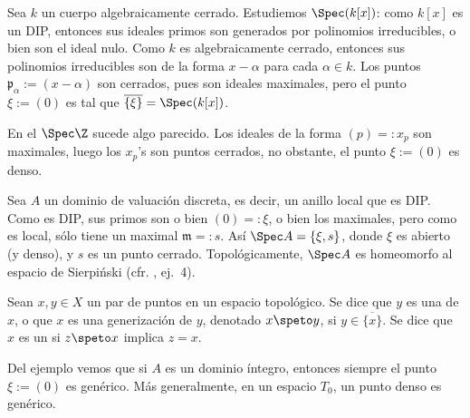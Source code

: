 \begin{ex}
	Sea $k$ un cuerpo algebraicamente cerrado.
	Estudiemos $\Spec(k[x])$: como $k[x]$ es un DIP, entonces sus ideales primos son
	generados por polinomios irreducibles, o bien son el ideal nulo.
	Como $k$ es algebraicamente cerrado, entonces sus polinomios irreducibles son de la forma $x - \alpha$ para cada $\alpha \in k$.
	Los puntos $\mathfrak{p}_\alpha := (x - \alpha)$ son cerrados, pues son
	ideales maximales, pero el punto $\xi := (0)$ es tal que $\overline{\{ \xi \}} = \Spec(k[x])$.
\end{ex}
\begin{ex}
	En el $\Spec\Z$ sucede algo parecido.
	Los ideales de la forma $(p) =: x_p$ son maximales, luego los $x_p$'s son puntos cerrados, no obstante, el
	punto $\xi := (0)$ es denso.
\end{ex}






\begin{ex}
	Sea $A$ un dominio de valuación discreta, es decir, un anillo local que es DIP.
	Como es DIP, sus primos son o bien $(0) =: \xi$, o bien los maximales, pero como es local,
	sólo tiene un maximal $\mathfrak{m} =: s$.
	Así $\Spec A = \{ \xi, s \}$, donde $\xi$ es abierto (y denso), y $s$ es un punto cerrado.
	Topológicamente, $\Spec A$ es homeomorfo al espacio de Sierpiński (cfr. \cite{Top}, ej.~4).
\end{ex}
\begin{mydef}
	Sean $x, y \in X$ un par de puntos en un espacio topológico.
	Se dice que $y$ es una  de $x$, o que $x$ es una generización de $y$,
	denotado $x \speto y$, si $y \in \overline{\{ x \}}$.
	Se dice que $x$ es un  si $z \speto x$ implica $z = x$.
\end{mydef}
Del ejemplo vemos que si $A$ es un dominio íntegro, entonces siempre el punto $\xi := (0)$ es genérico.
Más generalmente, en un espacio $T_0$, un punto denso es genérico.

